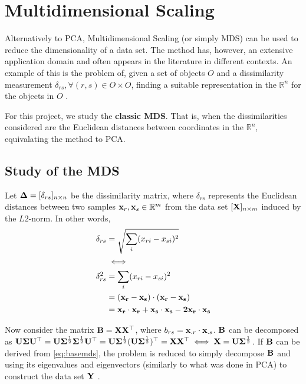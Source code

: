 \section{Multidimensional Scaling}

Alternatively to PCA, Multidimensional Scaling (or simply MDS) can be used to reduce the dimensionality of a data set. The method has, however, an extensive application domain and often appears in the literature in different contexts. An example of this is the problem of, given a set of objects $O$ and a dissimilarity measurement $\delta_{rs}, \forall (r, s) \in O\times O$, finding a suitable representation in the $\mathbb{R}^n$ for the objects in $O$ \cite{cox2001}.

For this project, we study the \textbf{classic MDS}. That is, when the dissimilarities considered are the Euclidean distances between coordinates in the $\mathbb{R}^n$, equivalating the method to PCA.

\subsection{Study of the MDS}

Let $\mathbf{\Delta} = [\delta_{rs}]_{n\times n}$ be the dissimilarity matrix, where $\delta_{rs}$ represents the Euclidean distances between two samples $\mathbf{x}_r, \mathbf{x}_s\in \mathbb{R}^m$ from the data set $[\mathbf{X}]_{n\times m}$ induced by the $L2$-norm. In other words,
\begin{align}
\label{eq:basemds}
\begin{split}
  \delta_{rs}  &= \sqrt{\sum_i (x_{ri}-x_{si})^2} \\
  &\iff \\
  \delta_{rs}^2 &= \sum_i (x_{ri}-x_{si})^2 \\
  &= (\mathbf{x_r-x_s}) \cdot (\mathbf{x_r-x_s}) \\
  &= \mathbf{x_r\cdot x_r + x_s\cdot x_s -2x_r\cdot x_s}
\end{split}
\end{align}

Now consider the matrix $\mathbf{B=XX^\top}$, where $b_{rs}=\mathbf{x}_{.r}\cdot \mathbf{x}_{.s}$. $\mathbf{B}$ can be decomposed as $\mathbf{U\Sigma U^\top} = \mathbf{U} \mathbf{\Sigma}^\frac{1}{2} \mathbf{\Sigma}^\frac{1}{2} \mathbf{U}^\top=\mathbf{U} \mathbf{\Sigma}^\frac{1}{2} (\mathbf{U} \mathbf{\Sigma}^\frac{1}{2})^\top = \mathbf{XX^\top}\iff \mathbf{X=U} \mathbf{\Sigma}^\frac{1}{2}$. If $\mathbf{B}$ can be derived from \ref{eq:basemds}, the problem is reduced to simply decompose $\mathbf{B}$ and using its eigenvalues and eigenvectors (similarly to what was done in PCA) to construct the data set $\mathbf{Y}$ \cite{cox2001}.

